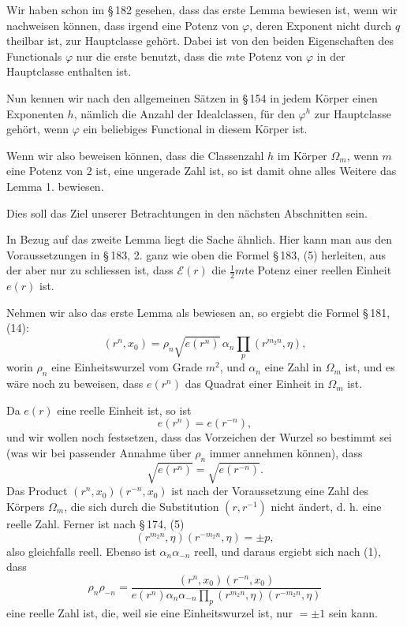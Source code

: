 \documentclass[11pt]{article}
\begin{document}
Wir haben schon im \S\,182 gesehen, dass das erste Lemma bewiesen ist, wenn wir nachweisen können, dass irgend eine Potenz von $\varphi$, deren Exponent nicht durch $q$ theilbar ist, zur Hauptclasse gehört. Dabei ist von den beiden Eigenschaften des Functionals $\varphi$ nur die erste benutzt, dass die $m$te Potenz von $\varphi$ in der Hauptclasse enthalten ist.

Nun kennen wir nach den allgemeinen Sätzen in \S\,154 in jedem Körper einen Exponenten $h$, nämlich die Anzahl der Idealclassen, für den $\varphi^h$ zur Hauptclasse gehört, wenn $\varphi$ ein beliebiges Functional in diesem Körper ist.

Wenn wir also beweisen können, dass die Classenzahl $h$ im Körper $\Omega_m$, wenn $m$ eine Potenz von 2 ist, eine ungerade Zahl ist, so ist damit ohne alles Weitere das Lemma 1. bewiesen.

Dies soll das Ziel unserer Betrachtungen in den nächsten Abschnitten sein.

In Bezug auf das zweite Lemma liegt die Sache ähnlich. Hier kann man aus den Voraussetzungen in \S\,183, 2. ganz wie oben die Formel \S\,183, (5) herleiten, aus der aber nur zu schliessen ist, dass $\mathscr E(r)$ die $\frac12m$te Potenz einer reellen Einheit $e(r)$ ist.

Nehmen wir also das erste Lemma als bewiesen an, so ergiebt die Formel \S\,181, (14):
\begin{equation}
(r^n,x_0)=\rho_n\sqrt{e(r^n)}\,\alpha_n\prod_p (r^{m_2n},\eta),
\tag{1}
\end{equation}
worin $\rho_n$ eine Einheitswurzel vom Grade $m^2$, und $\alpha_n$ eine Zahl in $\Omega_m$ ist, und es wäre noch zu beweisen, dass $e(r^n)$ das Quadrat einer Einheit in $\Omega_m$ ist.

Da $e(r)$ eine reelle Einheit ist, so ist
\begin{equation}
e(r^n)=e(r^{-n}),
\tag{2}
\end{equation}
und wir wollen noch festsetzen, dass das Vorzeichen der Wurzel so bestimmt sei (was wir bei passender Annahme über $\rho_n$ immer annehmen können), dass
\begin{equation}
\sqrt{e(r^n)}=\sqrt{e(r^{-n})}.
\tag{3}
\end{equation}
Das Product $(r^n,x_0)(r^{-n},x_0)$ ist nach der Voraussetzung eine Zahl des Körpers $\Omega_m$, die sich durch die Substitution $(r,r^{-1})$ nicht ändert, d. h. eine reelle Zahl. Ferner ist nach \S\,174, (5)
\[
(r^{m_2n},\eta)(r^{-m_2n},\eta)=\pm p,
\]
also gleichfalls reell. Ebenso ist $\alpha_n\alpha_{-n}$ reell, und daraus ergiebt sich nach (1), dass
\[
\rho_n\rho_{-n}=\frac{(r^n,x_0)(r^{-n},x_0)}{e(r^n)\alpha_n\alpha_{-n}\prod_p (r^{m_2n},\eta)(r^{-m_2n},\eta)}
\]
eine reelle Zahl ist, die, weil sie eine Einheitswurzel ist, nur $=\pm1$ sein kann.
\end{document}

